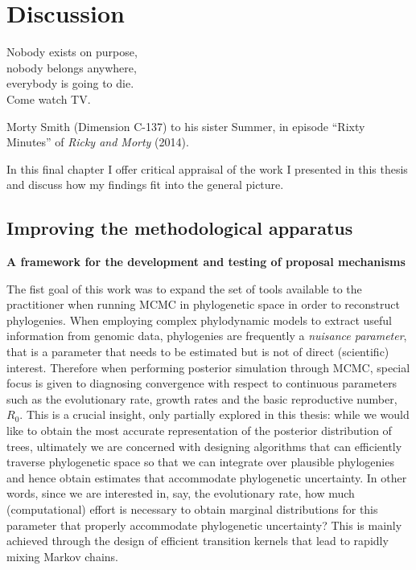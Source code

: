 \chapter{Discussion}
\epigraph{ 
Nobody exists on purpose, \\
nobody belongs anywhere, \\
everybody is  going to die.\\
Come watch TV.
}{Morty Smith (Dimension C-137) to his sister Summer, in episode ``Rixty Minutes'' of \textit{Ricky and Morty} (2014).}

In this final chapter I offer critical appraisal of the work I presented in this thesis and discuss how my findings fit into the general picture.

\section{Improving the methodological apparatus}

\textbf{A framework for the development and testing of proposal mechanisms}

The fist goal of this work was to expand the set of tools available to the practitioner when running MCMC in phylogenetic space in order to reconstruct phylogenies.
When employing complex phylodynamic models to extract useful information from genomic data, phylogenies are frequently a \textit{nuisance parameter}, that is a parameter that needs to be estimated but is not of direct (scientific) interest.
Therefore when performing posterior simulation through MCMC, special focus is given to diagnosing convergence with respect to continuous parameters  such as the evolutionary rate, growth rates and the basic reproductive number, $R_0$.
This is a crucial insight, only partially explored in this thesis: while we would like to obtain the most accurate representation of the posterior distribution of trees, ultimately we are concerned with designing algorithms that can efficiently traverse phylogenetic space so that we can integrate over plausible phylogenies and hence obtain estimates that accommodate phylogenetic uncertainty. 
In other words, since we are interested in, say, the evolutionary rate, how much (computational) effort is necessary to obtain marginal distributions for this parameter that properly accommodate phylogenetic uncertainty?
This is mainly achieved through the design of efficient transition kernels that lead to rapidly mixing Markov chains.

